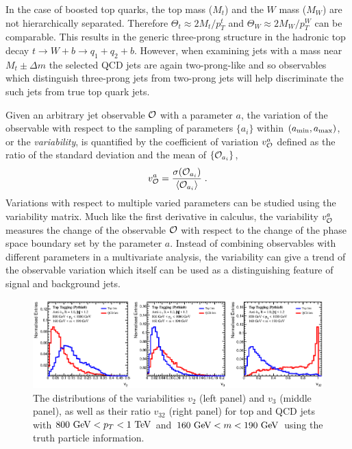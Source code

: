 \documentclass[aps,prl,floatfix,preprintnumbers,twocolumn,groupedaddress,nofootinbib]{revtex4-1}
\newcommand{\be}{\begin{equation}}
\newcommand{\ee}{\end{equation}}
\begin{document}
In the case of boosted top quarks, the top mass ($M_t$) and the $W$ mass ($M_W$) are not hierarchically separated. Therefore $\Theta_t \approx 2M_t/p_T^t$ and $\Theta_W \approx 2M_W/p_T^W$ can be comparable. This results in the generic three-prong structure in the hadronic top decay $t\rightarrow W+b \rightarrow q_1 + q_2 +b$. However, when examining jets with a mass near $M_t\pm \Delta m$ the selected QCD jets are again two-prong-like and so observables which distinguish three-prong jets from two-prong jets will help discriminate the such jets from true top quark jets.

Given an arbitrary jet observable $\cal O$ with a parameter $a$,
the variation of the observable with respect to the sampling of parameters $\{a_i\}$ within $(a_{\rm min},a_{\rm max})$, or the {\sl variability}, is quantified by the coefficient of variation $v_{\cal O}^a$ defined as the ratio of the standard deviation and the mean of $\{{\cal O}_{a_i}\}$,
\be
    v_{\cal O}^a = \frac{\sigma({\cal O}_{a_i})}{\langle {\cal O}_{a_i}\rangle}\;.
\ee
Variations with respect to multiple varied parameters can be studied using the variability matrix. Much like the first derivative in calculus, the variability $v_{\cal O}^a$ measures the change of the observable $\cal O$ with respect to the change of the phase space boundary set by the parameter $a$. Instead of combining observables with different parameters in a multivariate analysis, the variability can give a trend of the observable variation which itself can be used as a distinguishing feature of signal and background jets.

\begin{figure}
    \includegraphics[width=2\columnwidth]{plots/Top_vs_high.eps}
    \caption{The distributions of the variabilities $v_2$ (left panel) and $v_3$ (middle panel), as well as their ratio $v_{32}$ (right panel) for top and QCD jets with $800~{\rm GeV} < p_T < 1~{\rm TeV}$ and $160~{\rm GeV} < m < 190~{\rm GeV}$ using the truth particle information.}
\label{v32}
\end{figure}
\end{document}

